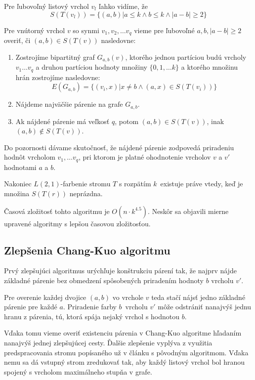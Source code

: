 Pre ľubovoľný listový vrchol $v_l$ ľahko vidíme, že 
$$S(T(v_l)) = \{ (a, b) | a \leq k \wedge b \leq k \wedge |a - b| \ge 2\}$$

Pre vnútorný vrchol $v$ so synmi $v_1, v_2, \ldots v_q$ vieme pre ľubovoľné $a, b, |a - b| \ge 2$ overiť,
či $(a, b) \in S(T(v))$ nasledovne:

\begin{enumerate}
    \item Zostrojíme bipartitný graf $G_{a,b}(v)$, ktorého jednou partíciou budú vrcholy $v_1 \ldots v_q$ a
    druhou partíciou hodnoty množiny $\{0, 1, \ldots k\}$ a ktorého množinu hrán zostrojíme nasledovne:
    $$E(G_{a,b}) = \{ (v_i, x) | x \neq b \wedge (a, x) \in S(T(v_i))\}$$
    \item Nájdeme najväčšie párenie na grafe $G_{a,b}$.
    \item Ak nájdené párenie má veľkosť $q$, potom $(a,b) \in S(T(v))$, inak $(a,b) \notin S(T(v))$.
\end{enumerate}

Do pozornosti dávame skutočnosť, že nájdené párenie zodpovedá priradeniu hodnôt vrcholom
$v_1, \ldots v_q$, pri ktorom je platné ohodnotenie vrcholov $v$ a $v'$ hodnotami $a$ a $b$.

Nakoniec $L(2,1)$-farbenie stromu $T$ s rozpätím $k$ existuje práve vtedy, keď je množina
$S(T(r))$ neprázdna.

Časová zložitosť tohto algoritmu je $O(n \cdot k^{4.5})$\cite{chang_kuo}. Neskôr sa objavili
mierne upravené algoritmy s lepšou časovou zložitosťou.

\subsection{Zlepšenia Chang-Kuo algoritmu}

Prvý zlepšujúci algoritmus urýchľuje konštrukciu
párení tak, že najprv nájde základné párenie bez obmedzení spôsobených priradením hodnoty $b$
vrcholu $v'$.

Pre overenie každej dvojice $(a,b)$ vo vrchole $v$ teda stačí nájsť jedno základné
párenie pre každé $a$. Priradenie farby $b$ vrcholu $v'$ môže odstrániť nanajvýš jednu hranu z párenia,
tú, ktorá spája nejaký vrchol s hodnotou $b$. 

Vďaka tomu vieme overiť existenciu párenia v Chang-Kuo algoritme hľadaním nanajvýš
jednej zlepšujúcej cesty. Ďalšie zlepšenie vyplýva z využitia predspracovania stromu popísaného
už v článku s pôvodným algoritmom. Vďaka nemu sa dá vstupný strom zredukovať tak, aby každý
listový vrchol bol hranou spojený s vrcholom maximálneho stupňa v grafe\cite{chang_kuo}.

